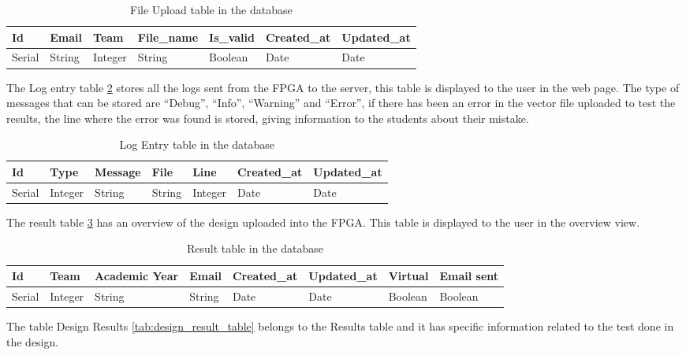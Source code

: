 \begin{table}[h!]
\centering
    \begin{tabular}{ | l | l | l | l | l | l | l |}
    \hline
    Id & Email & Team & File\_name & Is\_valid & Created\_at & Updated\_at  \\ \hline
    Serial & String & Integer & String & Boolean & Date & Date \\ \hline
    \end{tabular}
    \caption{File Upload table in the database}
    \label{tab:file_upload_table}
\end{table}

The Log entry table \ref{tab:log_entry_table} stores all the logs sent from the FPGA to the server, this table is displayed to the user in the web page. The type of messages that can be stored are ``Debug'', ``Info'', ``Warning'' and ``Error'',
if there has been an error in the vector file uploaded to test the results, the line where the error was found is stored, giving information to the students about their mistake.

\begin{table}[h!]
\centering
    \begin{tabular}{ | l | l | l | l | l | l | l |}
    \hline
    Id & Type & Message & File & Line & Created\_at & Updated\_at  \\ \hline
    Serial & Integer & String & String & Integer & Date & Date \\ \hline
    \end{tabular}
    \caption{Log Entry table in the database}
    \label{tab:log_entry_table}
\end{table}

The result table \ref{tab:Result_table} has an overview of the design uploaded into the FPGA. This table is displayed to the user in the overview view.

\begin{table}[h!]
\centering
    \begin{tabular}{ | l | l | l | l | l | l | l | l |}
    \hline
    Id & Team & Academic Year & Email & Created\_at & Updated\_at & Virtual & Email sent \\ \hline
    Serial & Integer & String & String & Date & Date & Boolean & Boolean\\ \hline
    \end{tabular}
    \caption{Result table in the database}
    \label{tab:Result_table}
\end{table}

The table Design Results \ref{tab:design_result_table} belongs to the Results table and it has specific information related to the test done in the design.

